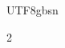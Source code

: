 \documentclass{article}
\begin{document}
\begin{CJK}{UTF8}{gbsn}
\begin{multicols}{2}
        \clearpage
    \end{multicols}
    
    

    \clearpage\end{CJK}
\end{document}
